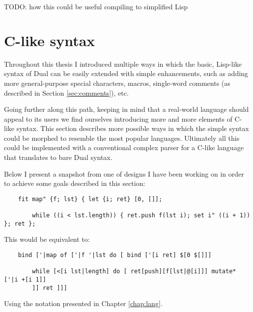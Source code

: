 TODO: how this could be useful compiling to simplified Lisp
 
\section{C-like syntax}
Throughout this thesis I introduced multiple ways in which the basic, Lisp-like
syntax of Dual can be easily extended with simple enhancements, such as adding
more general-purpose special characters, macros, single-word comments (as
described in Section \ref{sec:comments}), etc.

Going further along this path, keeping in mind that a real-world language should
appeal to its users we find ourselves introducing more and more elements of
C-like syntax. This section describes more possible ways in which the simple
syntax could be morphed to resemble the most popular languages.  Ultimately all
this could be implemented with a conventional complex parser for a C-like
language that translates to bare Dual syntax.

Below I present a snapshot from one of designs I have been working on in order
to achieve some goals described in this section:
\begin{lstlisting}
    fit map" {f; lst} { let {i; ret} [0, []];
    	
    	while ((i < lst.length)) { ret.push f(lst i); set i" ((i + 1)) }; ret };
\end{lstlisting}

This would be equivalent to:
\begin{lstlisting}
    bind ['|map of ['|f '|lst do [ bind ['[i ret] $[0 $[]]]
    	
    	while [<[i lst|length] do [ ret[push][f[lst|@[i]]] mutate* ['|i +[i 1]]
        ]] ret ]]]
\end{lstlisting}

Using the notation presented in Chapter \ref{chap:lang}.

